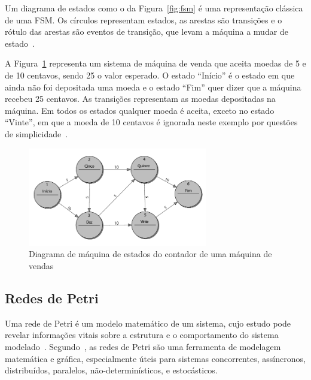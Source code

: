 Um diagrama de estados como o da Figura~\ref{fig:fsm} é uma representação clássica de uma FSM\@. Os círculos representam estados, as arestas são transições e o rótulo das arestas são eventos de transição, que levam a máquina a mudar de estado~\cite{marwedel:2010}.

A Figura~\ref{fig:fsm_2} representa um sistema de máquina de venda que aceita moedas de 5 e de 10 centavos, sendo 25 o valor esperado. O estado ``Início'' é o estado em que ainda não foi depositada uma moeda e o estado ``Fim'' quer dizer que a máquina recebeu 25 centavos. As transições representam as moedas depositadas na máquina. Em todos os estados qualquer moeda é aceita, exceto no estado ``Vinte'', em que a moeda de 10 centavos é ignorada neste exemplo por questões de simplicidade~\cite{wagner:2006}.

\begin{figure}[ht]
	\caption{\label{fig:fsm_2}Diagrama de máquina de estados do contador de uma máquina de vendas}
	\begin{center}
	    \includegraphics[width=0.7\textwidth]{resources/fsm_wagner}
	\end{center}
\end{figure}


\subsection{Redes de Petri}\label{sec:petrinet}

Uma rede de Petri é um modelo matemático de um sistema, cujo estudo pode revelar informações vitais sobre a estrutura e o comportamento do sistema modelado~\cite{peterson:1981}. Segundo~, as redes de Petri são uma ferramenta de modelagem matemática e gráfica, especialmente úteis para sistemas concorrentes, assíncronos, distribuídos, paralelos, não-determinísticos, e estocásticos.

